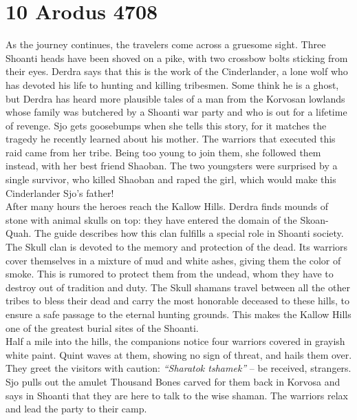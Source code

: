 \section{10 Arodus 4708}

As the journey continues, the travelers come across a gruesome sight. Three Shoanti heads have been shoved on a pike, with two crossbow bolts sticking from their eyes. Derdra says that this is the work of the Cinderlander, a lone wolf who has devoted his life to hunting and killing tribesmen. Some think he is a ghost, but Derdra has heard more plausible tales of a man from the Korvosan lowlands whose family was butchered by a Shoanti war party and who is out for a lifetime of revenge. Sjo gets goosebumps when she tells this story, for it matches the tragedy he recently learned about his mother. The warriors that executed this raid came from her tribe. Being too young to join them, she followed them instead, with her best friend Shaoban. The two youngsters were surprised by a single survivor, who killed Shaoban and raped the girl, which would make this Cinderlander Sjo's father!\\

After many hours the heroes reach the Kallow Hills. Derdra finds mounds of stone with animal skulls on top: they have entered the domain of the Skoan-Quah. The guide describes how this clan fulfills a special role in Shoanti society. The Skull clan is devoted to the memory and protection of the dead. Its warriors cover themselves in a mixture of mud and white ashes, giving them the color of smoke. This is rumored to protect them from the undead, whom they have to destroy out of tradition and duty. The Skull shamans travel between all the other tribes to bless their dead and carry the most honorable deceased to these hills, to ensure a safe passage to the eternal hunting grounds. This makes the Kallow Hills one of the greatest burial sites of the Shoanti.\\

Half a mile into the hills, the companions notice four warriors covered in grayish white paint. Quint waves at them, showing no sign of threat, and hails them over. They greet the visitors with caution: {\itshape``Sharatok tshamek''} -- be received, strangers. Sjo pulls out the amulet Thousand Bones carved for them back in Korvosa and says in Shoanti that they are here to talk to the wise shaman. The warriors relax and lead the party to their camp.\\

